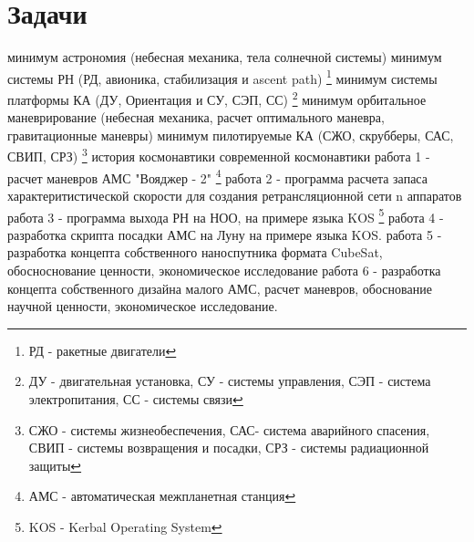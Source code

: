 \documentclass{article}
\begin{document}
\section{Задачи}
\begin{enumerate}
     минимум астрономия (небесная механика, тела солнечной системы)
     минимум системы РН (РД, авионика, стабилизация и ascent path)
    \footnote{РД - ракетные двигатели}
     минимум системы платформы КА (ДУ, Ориентация и СУ, СЭП, СС)
    \footnote{ДУ - двигательная установка, СУ - системы управления, СЭП - система электропитания, СС - системы связи}
     минимум орбитальное маневрирование (небесная механика, расчет оптимального маневра, гравитационные маневры)
     минимум пилотируемые КА (СЖО, скрубберы, САС, СВИП, СРЗ)
    \footnote{СЖО - системы жизнеобеспечения, САС- система аварийного спасения, СВИП - системы возвращения и посадки, СРЗ - системы радиационной защиты}
     история космонавтики
     современной космонавтики
     работа 1 - расчет маневров АМС "Вояджер - 2"
    \footnote{АМС - автоматическая межпланетная станция}
     работа 2 - программа расчета запаса характеритистической скорости для создания ретрансляционной сети n аппаратов
     работа 3 - программа выхода РН на НОО, на примере языка KOS
    \footnote{KOS - Kerbal Operating System}
     работа 4 - разработка скрипта посадки АМС на Луну на примере языка KOS.
     работа 5 - разработка концепта собственного наноспутника формата CubeSat, обосноснование ценности, экономическое исследование
     работа 6 - разработка концепта собственного дизайна малого АМС, расчет маневров, обоснование научной ценности, экономическое исследование.
\end{enumerate}
\end{document}
